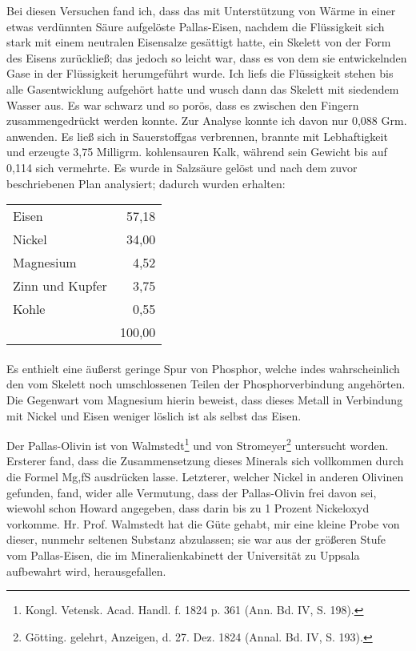 \documentclass[a4paper, 11pt, oneside]{article}
\begin{document}
Bei diesen Versuchen fand ich, dass das mit Unterstützung von Wärme in einer etwas verdünnten Säure aufgelöste Pallas-Eisen, nachdem die Flüssigkeit sich stark mit einem neutralen Eisensalze gesättigt hatte, ein Skelett von der Form des Eisens zurückließ; das jedoch so leicht war, dass es von dem sie entwickelnden Gase in der Flüssigkeit herumgeführt wurde. Ich liefs die Flüssigkeit stehen bis alle Gasentwicklung aufgehört hatte und wusch dann das Skelett mit siedendem Wasser aus. Es war schwarz und so porös, dass es zwischen den Fingern zusammengedrückt werden konnte. Zur Analyse konnte ich davon nur 0,088 Grm. anwenden. Es ließ sich in Sauerstoffgas verbrennen, brannte mit Lebhaftigkeit und erzeugte 3,75 Milligrm. kohlensauren Kalk, während sein Gewicht bis auf 0,114 sich vermehrte. Es wurde in Salzsäure gelöst und nach dem zuvor beschriebenen Plan analysiert; dadurch wurden erhalten:
\begin{center}
\begin{tabular}{ l r }
    Eisen & 57,18\\
    Nickel & 34,00\\
    Magnesium & 4,52\\
    Zinn und Kupfer & 3,75\\
    Kohle & 0,55\\
     & 100,00\\
\end{tabular}
\end{center}
\paragraph{}
Es enthielt eine äußerst geringe Spur von Phosphor, welche indes wahrscheinlich den vom Skelett noch umschlossenen Teilen der Phosphorverbindung angehörten. Die Gegenwart vom Magnesium hierin beweist, dass dieses Metall in Verbindung mit Nickel und Eisen weniger löslich ist als selbst das Eisen.

Der Pallas-Olivin ist von Walmstedt\footnote{Kongl. Vetensk. Acad. Handl. f. 1824 p. 361 (Ann. Bd. IV, S. 198).} und von Stromeyer\footnote{Götting. gelehrt, Anzeigen, d. 27. Dez. 1824 (Annal. Bd. IV, S. 193).} untersucht worden. Ersterer fand, dass die Zusammensetzung dieses Minerals sich vollkommen durch die Formel {Mg,f}S ausdrücken lasse. Letzterer, welcher Nickel in anderen Olivinen gefunden, fand, wider alle Vermutung, dass der Pallas-Olivin frei davon sei, wiewohl schon Howard angegeben, dass darin bis zu 1 Prozent Nickeloxyd vorkomme. Hr. Prof. Walmstedt hat die Güte gehabt, mir eine kleine Probe von dieser, nunmehr seltenen Substanz abzulassen; sie war aus der größeren Stufe vom Pallas-Eisen, die im Mineralienkabinett der Universität zu Uppsala aufbewahrt wird, herausgefallen.
\end{document}
